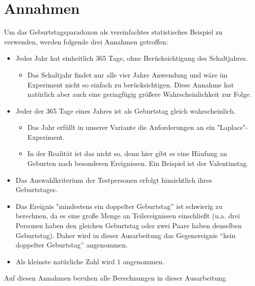 \documentclass[11pt]{article}
\begin{document}
    \section{Annahmen}

    Um das Geburtstagsparadoxon als vereinfachtes statistisches Beispiel zu verwenden, werden folgende drei Annahmen getroffen:

    \begin{itemize}
        \item Jedes Jahr hat einheitlich 365 Tage, ohne Berücksichtigung des Schaltjahres.
        \begin{itemize}
            \item Das Schaltjahr findet nur alle vier Jahre Anwendung und wäre im Experiment nicht so einfach zu berücksichtigen. Diese Annahme hat natürlich aber auch eine geringfügig größere Wahrscheinlichkeit zur Folge.
        \end{itemize}
    \end{itemize}

    \begin{itemize}
        \item Jeder der 365 Tage eines Jahres ist als Geburtstag gleich wahrscheinlich.

        \begin{itemize}
            \item Das Jahr erfüllt in unserer Variante die Anforderungen an ein "Laplace"-Experiment.
        \end{itemize}

        \begin{itemize}
            \item In der Realität ist das nicht so, denn hier gibt es eine Häufung an Geburten nach besonderen Ereignissen. Ein Beispiel ist der Valentinstag.
        \end{itemize}

    \end{itemize}

    \begin{itemize}
        \item Das Auswahlkriterium der Testpersonen erfolgt hinsichtlich ihres Geburtstages.
    \end{itemize}

    \begin{itemize}
        \item Das Ereignis "mindestens ein doppelter Geburtstag” ist schwierig zu berechnen, da es eine große Menge an Teilereignissen einschließt (u.a. drei Personen haben den gleichen Geburtstag oder zwei Paare haben denselben Geburtstag). Daher wird in dieser Ausarbeitung das Gegenereignis “kein doppelter Geburtstag” angenommen.
    \end{itemize}

    \begin{itemize}
        \item Als kleinste natürliche Zahl wird \(1\) angenommen.
    \end{itemize}

Auf diesen Annahmen beruhen alle Berechnungen in dieser Ausarbeitung.
\end{document}
